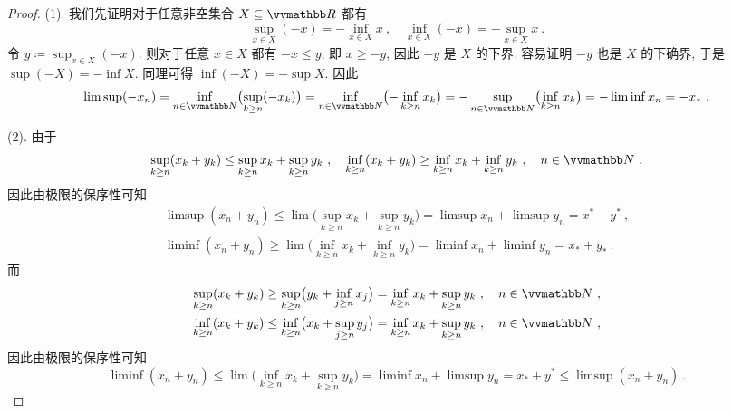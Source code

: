 \begin{proof}
    (1). 我们先证明对于任意非空集合 \(X \subseteq \R\) 都有
    \[
        \sup_{x \in X} (- x) = - \inf_{x \in X} x\ ,\quad \inf_{x \in X} (- x) = - \sup_{x \in X} x\ .
    \]
    令 \(y \coloneqq \sup_{x \in X} (- x)\). 则对于任意 \(x \in X\) 都有 \(- x \leq y\), 即 \(x \geq - y\), 因此 \(- y\) 是 \(X\) 的下界. 容易证明 \(- y\) 也是 \(X\) 的下确界, 于是 \(\sup (- X) = - \inf X\). 同理可得 \(\inf (- X) = - \sup X\). 因此
    \[
        \limsup (- x_n) = \inf_{n \in \N} \bigl(\sup_{k \geq n} (- x_k)\bigr) = \inf_{n \in \N} \bigl(- \inf_{k \geq n} x_k\bigr) = - \sup_{n \in \N} \bigl(\inf_{k \geq n} x_k\bigr) = - \liminf x_n = - x_\ast\ .
    \]

    (2). 由于
    \[
        \sup_{k \geq n} (x_k + y_k) \leq \sup_{k \geq n} x_k + \sup_{k \geq n} y_k\ ,\quad \inf_{k \geq n} (x_k + y_k) \geq \inf_{k \geq n} x_k + \inf_{k \geq n} y_k\ ,\quad n \in \N\ ,
    \]
    因此由极限的保序性可知
    \begin{align*}
        \limsup (x_n + y_n) \leq \lim \bigl(\sup_{k \geq n} x_k + \sup_{k \geq n} y_k\bigr) = \limsup x_n + \limsup y_n = x^\ast + y^\ast\ ,\\
        \liminf (x_n + y_n) \geq \lim \bigl(\inf_{k \geq n} x_k + \inf_{k \geq n} y_k\bigr) = \liminf x_n + \liminf y_n = x_\ast + y_\ast\ .
    \end{align*}
    而
    \begin{align*}
        \sup_{k \geq n} (x_k + y_k) \geq \sup_{k \geq n} \bigl(y_k + \inf_{j \geq n} x_j\bigr) = \inf_{k \geq n} x_k + \sup_{k \geq n} y_k\ ,\quad n \in \N\ ,\\
        \inf_{k \geq n} (x_k + y_k) \leq \inf_{k \geq n} \bigl(x_k + \sup_{j \geq n} y_j\bigr) = \inf_{k \geq n} x_k + \sup_{k \geq n} y_k\ ,\quad n \in \N\ ,
    \end{align*}
    因此由极限的保序性可知
    \[
        \liminf (x_n + y_n) \leq \lim \bigl(\inf_{k \geq n} x_k + \sup_{k \geq n} y_k\bigr) = \liminf x_n + \limsup y_n = x_\ast + y^\ast \leq \limsup (x_n + y_n)\ .
    \]


\end{proof}
